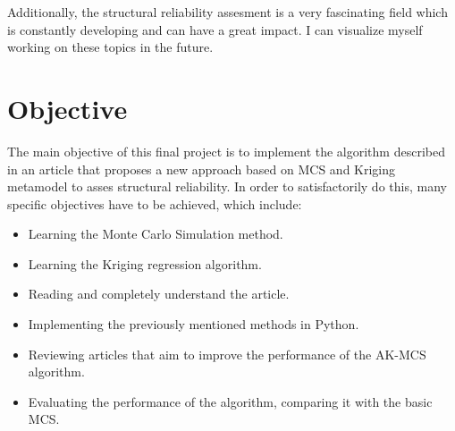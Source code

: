 Additionally, the structural reliability assesment is a very fascinating field which 
is constantly developing and can have a great impact. I can visualize myself working on these 
topics in the future.
\section{Objective}
The main objective of this final project is to implement the algorithm described in 
an article\cite{Echard2011} that proposes a new approach based on MCS and Kriging
metamodel to asses structural reliability. In order to satisfactorily do this, many
specific objectives have to be achieved, which include:
\begin{itemize}
    \item Learning the Monte Carlo Simulation method.
    \item Learning the Kriging regression algorithm.
    \item Reading and completely understand the article.
    \item Implementing the previously mentioned methods in Python.
    \item Reviewing articles that aim to improve the performance of the AK-MCS algorithm.
    \item Evaluating the performance of the algorithm, comparing it with the basic MCS.
\end{itemize}


